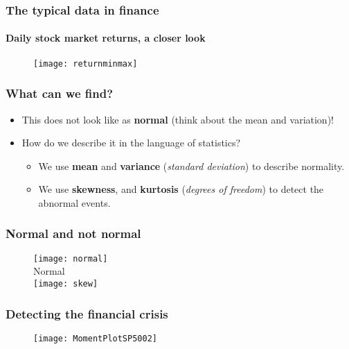 \documentclass[11pt]{beamer}
\begin{document}
\begin{frame}
  \frametitle{The typical data in finance}
  \framesubtitle{Daily stock market returns, a closer look}
  \begin{figure}
    \centering
    \texttt{[image: returnminmax]}
  \end{figure}
\end{frame}


\begin{frame}
  \frametitle{What can we find?}
  \begin{itemize}
  \item This does not look like as \textbf{normal} (think about the mean and variation)!
  \item How do we describe it in the language of statistics?

    \begin{itemize}
    \item We use \textbf{mean} and \textbf{variance} (\emph{standard deviation}) to describe normality.
    \item We use \textbf{skewness}, and \textbf{kurtosis} (\emph{degrees of freedom}) to detect the
      abnormal events.
    \end{itemize}

  \end{itemize}
\end{frame}

\begin{frame}
  \frametitle{Normal and not normal}
  \begin{figure}
    \centering
    \texttt{[image: normal]}\\
    Normal\\
    \texttt{[image: skew]}
  \end{figure}
\end{frame}


\begin{frame}
  \frametitle{Detecting the financial crisis}
  \begin{figure}
    \centering
    \texttt{[image: MomentPlotSP5002]}
  \end{figure}
\end{frame}
\end{document}
